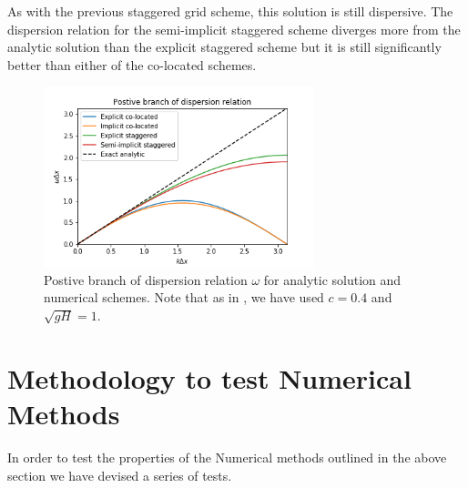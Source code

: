 \documentclass[a4paper,12pt, notitlepage]{article}
\begin{document}
As with the previous staggered grid scheme, this solution is still dispersive. The dispersion relation for the semi-implicit staggered scheme diverges more from the analytic solution than the explicit staggered scheme but it is still significantly better than either of the co-located schemes. 

\begin{figure}
	\centering
	\includegraphics[width=0.7\textwidth]{dispersion_relations.png}
	\caption{Postive branch of dispersion relation $\omega$ for analytic solution and numerical schemes. Note that as in \cite{MPE textbook}, we have used $c=0.4$ and $\sqrt{gH} = 1$.} \label{dispersionfigure}
\end{figure}

\section{Methodology to test Numerical Methods}
In order to test the properties of the Numerical methods outlined in the above section we have devised a series of tests.
\end{document}
